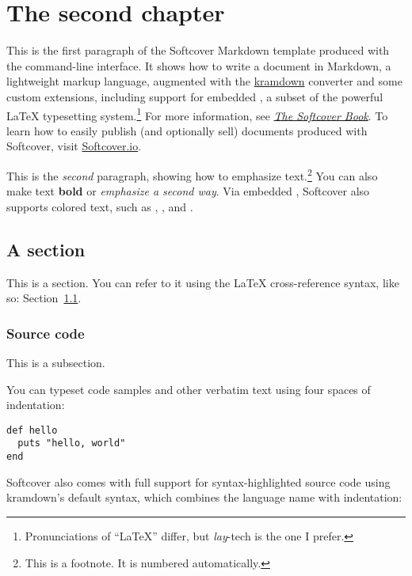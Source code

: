 \chapter{The second chapter}
\label{cha:a_chapter}

This is the first paragraph of the Softcover Markdown template produced with the \softcover{} command-line interface. It shows how to write a document in Markdown, a lightweight markup language, augmented with the \href{http://kramdown.gettalong.org/}{kramdown} converter and some custom extensions, including support for embedded \PolyTeX{}, a subset of the powerful \LaTeX{} typesetting system.\footnote{Pronunciations of {}``LaTeX{}'' differ, but \emph{lay}-tech is the one I prefer.} For more information, see \href{http://manual.softcover.io/book}{\emph{The Softcover Book}}. To learn how to easily publish (and optionally sell) documents produced with Softcover, visit \href{http://softcover.io/}{Softcover.io}.

This is the \emph{second} paragraph, showing how to emphasize text.\footnote{This is a footnote. It is numbered automatically.} You can also make text \textbf{bold} or \emph{emphasize a second way}. Via embedded \PolyTeX, Softcover also supports colored text, such as , , and .

\section{A section}

\label{sec:a_section}

This is a section. You can refer to it using the \LaTeX{} cross-reference syntax, like so: Section~\ref{sec:a_section}.

\subsection{Source code}

This is a subsection.

You can typeset code samples and other verbatim text using four spaces of indentation:

\begin{verbatim}
def hello
  puts "hello, world"
end
\end{verbatim}

Softcover also comes with full support for syntax-highlighted source code using kramdown{}'s default syntax, which combines the language name with indentation:

